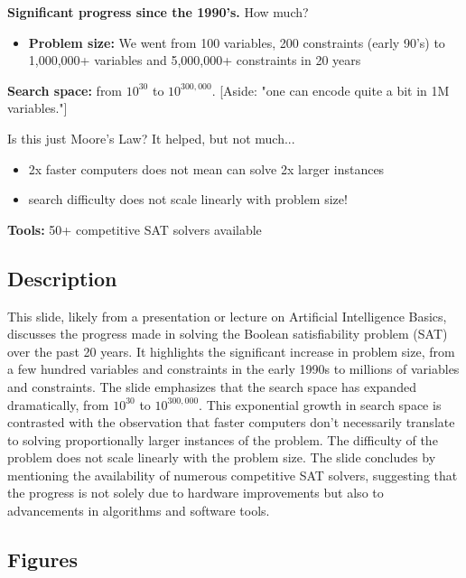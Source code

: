 \documentclass{article}%
\begin{document}
\textbf{Significant progress since the 1990's.} How much?

\begin{itemize}
    \item \textbf{Problem size:} We went from 100 variables, 200 constraints (early 90's) to 1,000,000+ variables and 5,000,000+ constraints in 20 years
\end{itemize}

\textbf{Search space:} from $10^{30}$ to $10^{300,000}$. [Aside: "one can encode quite a bit in 1M variables."]

Is this just Moore's Law? It helped, but not much...

\begin{itemize}
    \item 2x faster computers does not mean can solve 2x larger instances
    \item search difficulty does not scale linearly with problem size!
\end{itemize}

\textbf{Tools:} 50+ competitive SAT solvers available
%
\subsection{Description}%
This slide, likely from a presentation or lecture on Artificial Intelligence Basics, discusses the progress made in solving the Boolean satisfiability problem (SAT) over the past 20 years.  It highlights the significant increase in problem size, from a few hundred variables and constraints in the early 1990s to millions of variables and constraints.  The slide emphasizes that the search space has expanded dramatically, from $10^{30}$ to $10^{300,000}$.  This exponential growth in search space is contrasted with the observation that faster computers don't necessarily translate to solving proportionally larger instances of the problem.  The difficulty of the problem does not scale linearly with the problem size.  The slide concludes by mentioning the availability of numerous competitive SAT solvers, suggesting that the progress is not solely due to hardware improvements but also to advancements in algorithms and software tools.%
\subsection{Figures}%
\begin{figure}[H]%
\centering%
\end{figure}

%
\newpage%
\end{document}

